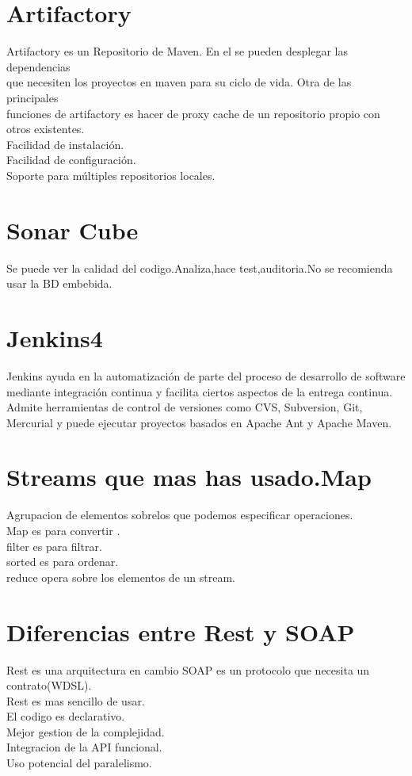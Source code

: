 \section{Artifactory}
Artifactory es un Repositorio de Maven. En el se pueden desplegar las dependencias\\
 que necesiten los proyectos en maven para su ciclo de vida. Otra de las principales\\
  funciones de artifactory es hacer de proxy cache de un repositorio propio con otros existentes.\\
  Facilidad de instalación.\\
  Facilidad de configuración.\\
  Soporte para múltiples repositorios locales.
\section{Sonar Cube}
Se puede ver la calidad del codigo.Analiza,hace test,auditoria.No se recomienda usar la BD embebida.
\section{Jenkins4}
Jenkins ayuda en la automatización de parte del proceso de desarrollo de software mediante integración continua y facilita ciertos aspectos de la entrega continua. Admite herramientas de control de versiones como CVS, Subversion, Git, Mercurial y puede ejecutar proyectos basados en Apache Ant y Apache Maven.
\section{Streams que mas has usado.Map}
Agrupacion de elementos sobrelos que podemos especificar operaciones.\\
Map es para convertir .\\
filter es para filtrar.\\
sorted es para ordenar.\\
reduce opera sobre los elementos de un stream.
\section{Diferencias entre Rest y SOAP}
Rest es una arquitectura en cambio SOAP es un protocolo que necesita un contrato(WDSL).\\
Rest es mas sencillo de usar.\\
El codigo es declarativo.\\
Mejor gestion de la complejidad.\\
Integracion de la API funcional.\\
Uso potencial del paralelismo.
